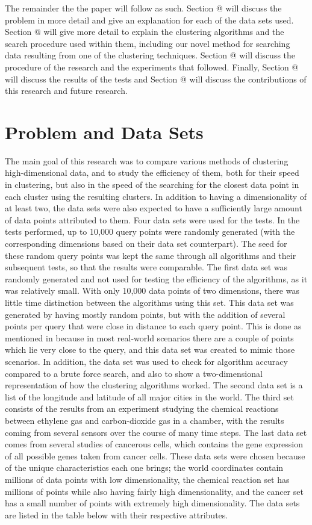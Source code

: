 \documentclass[journal]{IEEEtran}
\makeatletter
\newcommand*{\rom}[1]{\expandafter\@slowromancap\romannumeral #1@}
\makeatother
\begin{document}
The remainder the the paper will follow as such. Section \rom{2} will discuss the problem in more detail and give an explanation for each of the data sets used. Section \rom{3} will give more detail to explain the clustering algorithms and the search procedure used within them, including our novel method for searching data resulting from one of the clustering techniques. Section \rom{4} will discuss the procedure of the research and the experiments that followed. Finally, Section \rom{5} will discuss the results of the tests and Section \rom{6} will discuss the contributions of this research and future research.

\section{Problem and Data Sets}
The main goal of this research was to compare various methods of clustering high-dimensional data, and to study the efficiency of them, both for their speed in clustering, but also in the speed of the searching for the closest data point in each cluster using the resulting clusters. In addition to having a dimensionality of at least two, the data sets were also expected to have a sufficiently large amount of data points attributed to them. Four data sets were used for the tests. In the tests performed, up to 10,000 query points were randomly generated (with the corresponding dimensions based on their data set counterpart). The seed for these random query points was kept the same through all algorithms and their subsequent tests, so that the results were comparable. The first data set was randomly generated and not used for testing the efficiency of the algorithms, as it was relatively small. With only 10,000 data points of two dimensions, there was little time distinction between the algorithms using this set. This data set was generated by having mostly random points, but with the addition of several points per query that were close in distance to each query point. This is done as mentioned in \cite{lsh-1} because in most real-world scenarios there are a couple of points which lie very close to the query, and this data set was created to mimic those scenarios. In addition, the data set was used to check for algorithm accuracy compared to a brute force search, and also to show a two-dimensional representation of how the clustering algorithms worked. The second data set is a list of the longitude and latitude of all major cities in the world. The third set consists of the results from an experiment studying the chemical reactions between ethylene gas and carbon-dioxide gas in a chamber, with the results coming from several sensors over the course of many time steps. The last data set comes from several studies of cancerous cells, which contains the gene expression of all possible genes taken from cancer cells. These data sets were chosen because of the unique characteristics each one brings; the world coordinates contain millions of data points with low dimensionality, the chemical reaction set has millions of points while also having fairly high dimensionality, and the cancer set has a small number of points with extremely high dimensionality. The data sets are listed in the table below with their respective attributes.
\end{document}
